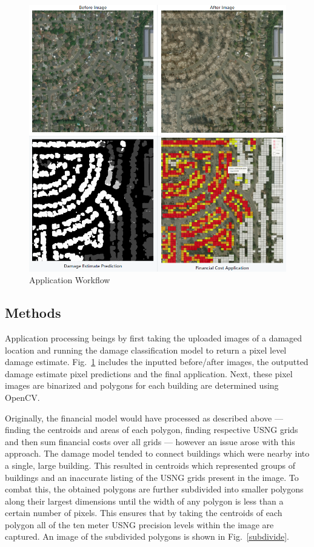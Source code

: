 \documentclass[conference]{IEEEtran}
\begin{document}
\begin{figure}[htbp]
\centering\includegraphics[width=1\linewidth]{applicationcombined.png}
\caption{Application Workflow}
\label{appworkflow}
\end{figure}

\subsection{Methods}
Application processing beings by first taking the uploaded images of a damaged location and running the damage classification model to return a pixel level damage estimate. Fig.~\ref{appworkflow} includes the inputted before/after images, the outputted damage estimate pixel predictions and the final application. Next, these pixel images are binarized and polygons for each building are determined using OpenCV. 

Originally, the financial model would have processed as described above --- finding the centroids and areas of each polygon, finding respective USNG grids and then sum financial costs over all grids --- however an issue arose with this approach. The damage model tended to connect buildings which were nearby into a single, large building. This resulted in centroids which represented groups of buildings and an inaccurate listing of the USNG grids present in the image. To combat this, the obtained polygons are further subdivided into smaller polygons along their largest dimensions until the width of any polygon is less than a certain number of pixels. This ensures that by taking the centroids of each polygon all of the ten meter USNG precision levels within the image are captured. An image of the subdivided polygons is shown in Fig.~\ref{subdivide}.
\end{document}
